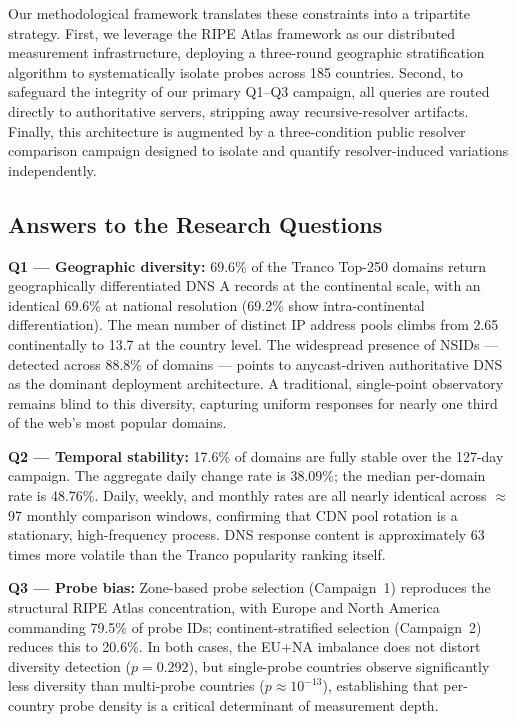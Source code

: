 Our methodological framework translates these constraints into a tripartite strategy. First, we leverage the RIPE Atlas framework as our distributed measurement infrastructure, deploying a three-round geographic stratification algorithm to systematically isolate probes across 185 countries. Second, to safeguard the integrity of our primary Q1--Q3 campaign, all queries are routed directly to authoritative servers, stripping away recursive-resolver artifacts. Finally, this architecture is augmented by a three-condition public resolver comparison campaign designed to isolate and quantify resolver-induced variations independently.

\bigskip
\subsection{Answers to the Research Questions}
\label{subsec:5.5.2}

\textbf{Q1 --- Geographic diversity:} 69.6\% of the Tranco Top-250 domains return geographically differentiated \ac{DNS} \ac{A} records at the continental scale, with an identical 69.6\% at national resolution (69.2\% show intra-continental differentiation). The mean number of distinct \ac{IP} address pools climbs from 2.65 continentally to 13.7 at the country level. The widespread presence of \ac{NSID}s --- detected across 88.8\% of domains --- points to anycast-driven authoritative \ac{DNS} as the dominant deployment architecture. A traditional, single-point observatory remains blind to this diversity, capturing uniform responses for nearly one third of the web's most popular domains.

\textbf{Q2 --- Temporal stability:} 17.6\% of domains are fully stable over the 127-day campaign. The aggregate daily change rate is 38.09\%; the median per-domain rate is 48.76\%. Daily, weekly, and monthly rates are all nearly identical across $\approx$97 monthly comparison windows, confirming that \ac{CDN} pool rotation is a stationary, high-frequency process. \ac{DNS} response content is approximately 63 times more volatile than the Tranco popularity ranking itself.

\textbf{Q3 --- Probe bias:} Zone-based probe selection (Campaign~1) reproduces the structural RIPE Atlas concentration, with Europe and North America commanding 79.5\% of probe IDs; continent-stratified selection (Campaign~2) reduces this to 20.6\%. In both cases, the EU+NA imbalance does not distort diversity detection ($p = 0.292$), but single-probe countries observe significantly less diversity than multi-probe countries ($p \approx 10^{-13}$), establishing that per-country probe density is a critical determinant of measurement depth.

